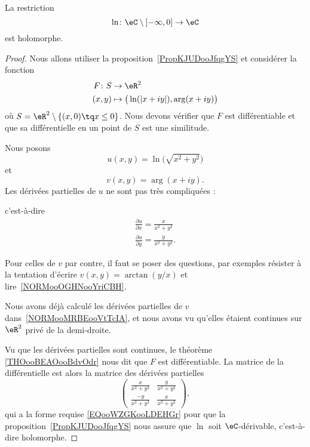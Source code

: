 \begin{theorem}     \label{THOooWUXOooYKvLbJ}
	La restriction
	\begin{equation}
		\ln\colon \eC\setminus\mathopen] -\infty , 0 \mathclose]\to \eC
	\end{equation}
	est holomorphe.
\end{theorem}

\begin{proof}
	Nous allons utiliser la proposition~\ref{PropKJUDooJfqgYS} et considérer la fonction
	\begin{equation}
		\begin{aligned}
			F\colon S & \to \eR^2                                    \\
			(x,y)     & \mapsto \big( \ln(| x+iy |),\arg(x+iy) \big)
		\end{aligned}
	\end{equation}
	où \( S=\eR^2\setminus\{ (x,0)\tq x\leq 0 \}\). Nous devons vérifier que \( F\) est différentiable et que sa différentielle en un point de \( S\) est une similitude.

	Nous posons
	\begin{equation}
		u(x,y)=\ln\big( \sqrt{ x^2+y^2 } \big)
	\end{equation}
	et
	\begin{equation}
		v(x,y)=\arg(x+iy).
	\end{equation}
	Les dérivées partielles de \( u\) ne sont pas très compliquées :
	
	c'est-à-dire
	\begin{subequations}
		\begin{align}
			\frac{ \partial u }{ \partial x }=\frac{ x }{ x^2+y^2 } \\
			\frac{ \partial u }{ \partial y }=\frac{ y }{ x^2+y^2 }.
		\end{align}
	\end{subequations}

	Pour celles de \( v \) par contre, il faut se poser des questions, par exemples résister à la tentation d'écrire \( v(x,y)=\arctan(y/x)\) et lire~\ref{NORMooOGHNooYriCBH}.

	Nous avons déjà calculé les dérivées partielles de \( v\) dans~\ref{NORMooMRBEooVtTcIA}, et nous avons vu qu'elles étaient continues sur \( \eR^2\) privé de la demi-droite.

	Vu que les dérivées partielles sont continues, le théorème \ref{THOooBEAOooBdvOdr} nous dit que \( F\) est différentiable. La matrice de la différentielle est alors la matrice des dérivées partielles
	\begin{equation}
		\begin{pmatrix}
			\frac{ x }{ x^2+y^2 }  & \frac{ y }{ x^2+y^2 } \\
			\frac{ -y }{ x^2+y^2 } & \frac{ x }{ x^2+y^2 }
		\end{pmatrix},
	\end{equation}
	qui a la forme requise \eqref{EQooWZGKooLDEHGr} pour que la proposition~\ref{PropKJUDooJfqgYS} nous assure que \( \ln\) soit \( \eC\)-dérivable, c'est-à-dire holomorphe.
\end{proof}


